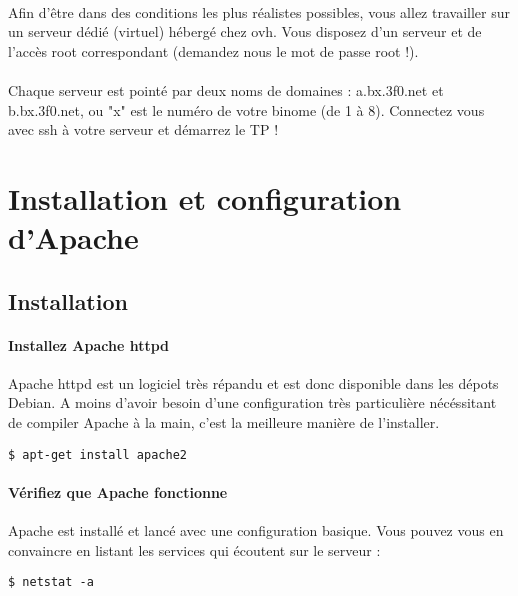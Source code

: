 \documentclass[12pt,a4paper]{article}
\begin{document}
\paragraph{}
Afin d'être dans des conditions les plus réalistes possibles, vous allez travailler sur un serveur dédié (virtuel) hébergé chez ovh. Vous disposez d'un serveur et de l'accès root correspondant (demandez nous le mot de passe root !).

\paragraph{}
Chaque serveur est pointé par deux noms de domaines : a.bx.3f0.net et b.bx.3f0.net, ou "x" est le numéro de votre binome (de 1 à 8). Connectez vous avec ssh à votre serveur et démarrez le TP !

\section{Installation et configuration d'Apache}
\subsection{Installation}

\paragraph{Installez Apache httpd\\}
Apache httpd est un logiciel très répandu et est donc disponible dans les dépots Debian. A moins d'avoir besoin d'une configuration très particulière nécéssitant de compiler Apache à la main, c'est la meilleure manière de l'installer.

\begin{lstlisting}
$ apt-get install apache2
\end{lstlisting}

\paragraph{Vérifiez que Apache fonctionne\\}
Apache est installé et lancé avec une configuration basique. Vous pouvez vous en convaincre en listant les services qui écoutent sur le serveur : 

\begin{lstlisting}
$ netstat -a
\end{lstlisting}
\end{document}
